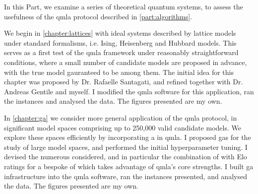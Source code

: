 In this Part, we examine a series of theoretical quantum systems, 
    to assess the usefulness of the \gls{qmla} protocol described in \cref{part:algorithms}. 
\par 
\vspace{1cm}

We begin in \cref{chapter:lattices} with ideal systems described by lattice models 
    under standard formalisms, i.e. Ising, Heisenberg and Hubbard models. 
This serves as a first test of the \gls{qmla} framework under reasonably straightforward
    conditions, where a small number of candidate models are proposed in advance, 
    with the true model gauranteed to be among them. 
The initial idea for this chapter was proposed by Dr. Rafaelle Santagati, 
    and refined together with Dr. Andreas Gentile and myself. 
I modified the \gls{qmla} software for this application, 
    ran the instances and analysed the data. 
The figures presented are my own.

\par 
\vspace{1cm}
In \cref{chapter:ga} we consider more general application of the \gls{qmla} protocol, 
    in significant model spaces comprising up to 250,000 valid candidate models. 
We explore these spaces efficiently by incorporating a  in \gls{qmla}. 
I proposed \glspl{ga} for the study of large model spaces, 
    and performed the initial hyperparameter tuning. 
I devised the numerous  considered, 
    and in particular the combination of 
    with Elo ratings for a bespoke \gls{of} which takes advantage of \gls{qmla}'s core strengths. 
I built \gls{ga} infrastructure into the \gls{qmla} software, 
    ran the instances presented, and analysed the data.
The figures presented are my own. 
